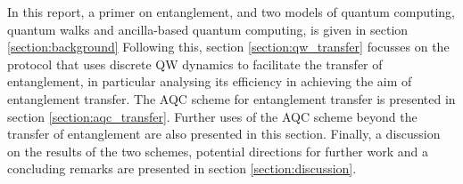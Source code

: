 In this report, a primer on entanglement, and two models of quantum computing, quantum walks and ancilla-based quantum computing, is given in section {\ref{section:background}}
Following this, section {\ref{section:qw_transfer}} focusses on the protocol that uses discrete QW dynamics to facilitate the transfer of entanglement, in particular analysing its efficiency in achieving the aim of entanglement transfer. 
The AQC scheme for entanglement transfer is presented in section \ref{section:aqc_transfer}. 
Further uses of the AQC scheme beyond the transfer of entanglement are also presented in this section. 
Finally, a discussion on the results of the two schemes, potential directions for further work and a concluding remarks are presented in section {\ref{section:discussion}}.